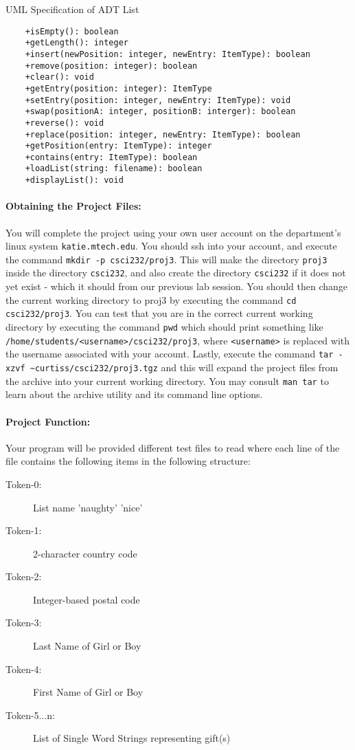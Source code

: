 \documentclass[10pt,letterpaper]{article}
\newcounter{x}\setcounter{x}{1}
\begin{document}
\begin{table}
\caption{UML Specification of ADT List} \label{uml:adtList}
\begin{lstlisting}
	+isEmpty(): boolean
	+getLength(): integer
	+insert(newPosition: integer, newEntry: ItemType): boolean
	+remove(position: integer): boolean
	+clear(): void
	+getEntry(position: integer): ItemType
	+setEntry(position: integer, newEntry: ItemType): void
	+swap(positionA: integer, positionB: interger): boolean
	+reverse(): void
	+replace(position: integer, newEntry: ItemType): boolean
	+getPosition(entry: ItemType): integer
	+contains(entry: ItemType): boolean
	+loadList(string: filename): boolean
	+displayList(): void
\end{lstlisting}
\end{table}

\paragraph{Obtaining the Project Files:} You will complete the project using your own user account on the department's linux system \verb|katie.mtech.edu|. You should ssh into your account, and execute the command \verb|mkdir -p csci232/proj3|. This will make the directory \verb|proj3| inside the directory \verb|csci232|, and also create the directory \verb|csci232| if it does not yet exist - which it should from our previous lab session. You should then change the current working directory to proj3 by executing the command \verb|cd csci232/proj3|. You can test that you are in the correct current working directory by executing the command \verb|pwd| which should print something like \verb|/home/students/<username>/csci232/proj3|, where \verb|<username>| is replaced with the username associated with your account. Lastly, execute the command \verb|tar -xzvf ~curtiss/csci232/proj3.tgz| and this will expand the project files from the archive into your current working directory. You may consult \verb|man tar| to learn about the archive utility and its command line options. 

\paragraph{Project Function:}  

Your program will be provided different test files to read where each line of the file contains the following items in the following structure: 

\begin{description}
    \item[Token-0:] List name 'naughty' 'nice'
	\item[Token-1:] 2-character country code
	\item[Token-2:] Integer-based postal code 
	\item[Token-3:] Last Name of Girl or Boy
	\item[Token-4:] First Name of Girl or Boy
	\item[Token-5...n:] List of Single Word Strings representing gift(s)
\end{description}
\end{document}
